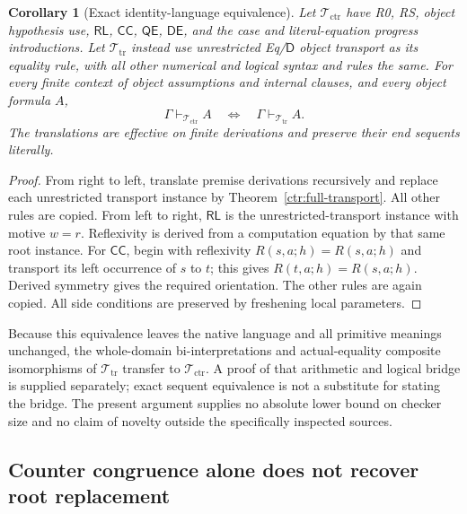 \documentclass[11pt,letterpaper]{article}
\newtheorem{corollary}[theorem]{Corollary}
\theoremstyle{definition}\newtheorem{definition}[theorem]{Definition}
\theoremstyle{remark}\newtheorem{remark}[theorem]{Remark}
\begin{document}
\begin{corollary}[Exact identity-language equivalence]
\label{ctr:exact-equivalence}
Let $\mathcal T_{\mathrm{ctr}}$ have R0, RS, object hypothesis use,
$\mathsf{RL}$, $\mathsf{CC}$, $\mathsf{QE}$,
$\mathsf{DE}$, and the case and literal-equation progress introductions.
Let $\mathcal T_{\mathrm{tr}}$ instead use unrestricted Eq/$\mathsf D$
object transport as its equality rule, with all other numerical and
logical syntax and rules the same. For every finite context of object
assumptions and internal clauses, and every object formula $A$,
\[
 \Gamma\vdash_{\mathcal T_{\mathrm{ctr}}}A
 \quad\Longleftrightarrow\quad
 \Gamma\vdash_{\mathcal T_{\mathrm{tr}}}A.
\]
The translations are effective on finite derivations and preserve their
end sequents literally.
\end{corollary}
\begin{proof}
From right to left, translate premise derivations recursively and replace
each unrestricted transport instance by
Theorem~\ref{ctr:full-transport}. All other rules are copied.
From left to right, $\mathsf{RL}$ is the unrestricted-transport instance
with motive $w=r$. Reflexivity is derived from a computation equation
by that same root instance. For $\mathsf{CC}$, begin with reflexivity
$R(s,a;h)=R(s,a;h)$ and transport its left occurrence of $s$ to $t$;
this gives $R(t,a;h)=R(s,a;h)$. Derived symmetry gives the required
orientation. The other rules are again copied. All side conditions are
preserved by freshening local parameters.
\end{proof}

Because this equivalence leaves the native language and all primitive
meanings unchanged, the whole-domain bi-interpretations and actual-equality
composite isomorphisms of $\mathcal T_{\mathrm{tr}}$ transfer to
$\mathcal T_{\mathrm{ctr}}$. A proof of that arithmetic and logical
bridge is supplied separately; exact sequent equivalence is not a
substitute for stating the bridge. The present argument supplies no
absolute lower bound on checker size and no claim of novelty outside
the specifically inspected sources.


\subsection{Counter congruence alone does not recover root replacement}
\label{rootind:section}
\end{document}

